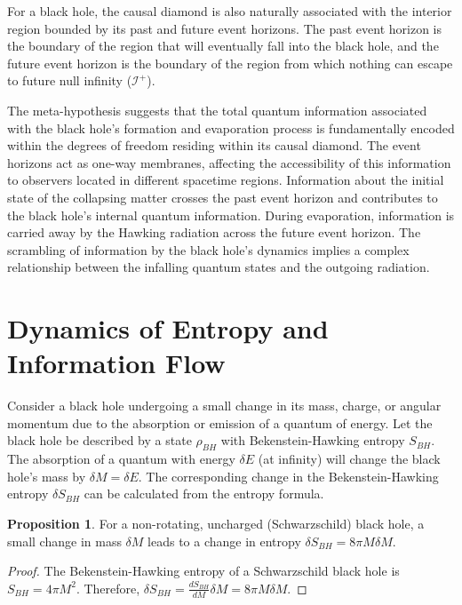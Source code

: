\documentclass{article}
\theoremstyle{definition}
\newtheorem{proposition}[definition]{Proposition}
\begin{document}
	For a black hole, the causal diamond is also naturally associated with the interior region bounded by its past and future event horizons. The past event horizon is the boundary of the region that will eventually fall into the black hole, and the future event horizon is the boundary of the region from which nothing can escape to future null infinity ($\mathcal{I}^+$).
	
	The meta-hypothesis suggests that the total quantum information associated with the black hole's formation and evaporation process is fundamentally encoded within the degrees of freedom residing within its causal diamond. The event horizons act as one-way membranes, affecting the accessibility of this information to observers located in different spacetime regions. Information about the initial state of the collapsing matter crosses the past event horizon and contributes to the black hole's internal quantum information. During evaporation, information is carried away by the Hawking radiation across the future event horizon. The scrambling of information by the black hole's dynamics implies a complex relationship between the infalling quantum states and the outgoing radiation.
	
	\section{Dynamics of Entropy and Information Flow}
	
	Consider a black hole undergoing a small change in its mass, charge, or angular momentum due to the absorption or emission of a quantum of energy. Let the black hole be described by a state $\rho_{BH}$ with Bekenstein-Hawking entropy $S_{BH}$. The absorption of a quantum with energy $\delta E$ (at infinity) will change the black hole's mass by $\delta M = \delta E$. The corresponding change in the Bekenstein-Hawking entropy $\delta S_{BH}$ can be calculated from the entropy formula.
	
	\begin{proposition}
		For a non-rotating, uncharged (Schwarzschild) black hole, a small change in mass $\delta M$ leads to a change in entropy $\delta S_{BH} = 8 \pi M \delta M$.
		\begin{proof}
			The Bekenstein-Hawking entropy of a Schwarzschild black hole is $S_{BH} = 4 \pi M^2$. Therefore, $\delta S_{BH} = \frac{d S_{BH}}{d M} \delta M = 8 \pi M \delta M$.
		\end{proof}
	\end{proposition}
	
\end{document}
